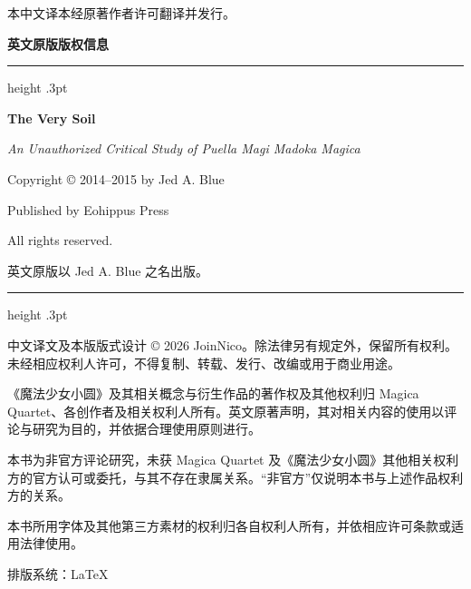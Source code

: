  \vspace{6.5pt}
  {\fontsize{7.1pt}{10pt}\selectfont
    本中文译本经原著作者许可翻译并发行。\par}

  \vspace{8pt}
  {\sffamily\bfseries\fontsize{6.8pt}{8.5pt}\selectfont
    英文原版版权信息\par}
  \vspace{2.5pt}
  \hrule height .3pt
  \vspace{4.5pt}

  {\rmfamily\fontsize{6.8pt}{8.8pt}\selectfont
    \textbf{The Very Soil}\par
    \textit{An Unauthorized Critical Study of Puella Magi Madoka Magica}\par
    Copyright © 2014--2015 by Jed A. Blue\par
    Published by Eohippus Press\par
    All rights reserved.\par}
  \vspace{2.5pt}
  {\sffamily\fontsize{5.7pt}{7.5pt}\selectfont
    英文原版以 Jed A. Blue 之名出版。\par}

  \vspace{6pt}
  \hrule height .3pt
  \vspace{5.5pt}

  {\fontsize{6.25pt}{8.9pt}\selectfont
    中文译文及本版版式设计 © 2026 JoinNico。除法律另有规定外，保留所有权利。未经相应权利人许可，不得复制、转载、发行、改编或用于商业用途。\par
    \vspace{3.2pt}
    《魔法少女小圆》及其相关概念与衍生作品的著作权及其他权利归 Magica Quartet、各创作者及相关权利人所有。英文原著声明，其对相关内容的使用以评论与研究为目的，并依据合理使用原则进行。\par
    \vspace{3.2pt}
    本书为非官方评论研究，未获 Magica Quartet 及《魔法少女小圆》其他相关权利方的官方认可或委托，与其不存在隶属关系。“非官方”仅说明本书与上述作品权利方的关系。\par
    \vspace{3.2pt}
    本书所用字体及其他第三方素材的权利归各自权利人所有，并依相应许可条款或适用法律使用。\par}

  \vspace{6pt}
  {\fontsize{5.8pt}{7.5pt}\selectfont
    排版系统：{\LaTeX}\par}
  \vspace*{2mm}
\endgroup
\clearpage
